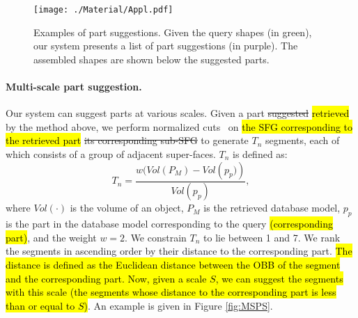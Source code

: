 \begin{figure}[t]\centering
\texttt{[image: ./Material/Appl.pdf]}
\caption{Examples of part suggestions. Given the query shapes (in green), our system presents a list of part suggestions (in purple). The assembled shapes are shown below the suggested parts.}\label{fig:appl}
\end{figure}

\paragraph*{Multi-scale part suggestion.} Our system can suggest parts at various scales. Given a part \st{suggested} \hl{retrieved} by the method above, we perform normalized cuts~\cite{randomizedcutsfunkhousertog2008} on \hl{the SFG corresponding to the retrieved part} \st{its corresponding sub-SFG} to generate $T_n$ segments, each of which consists of a group of adjacent super-faces. $T_n$ is defined as:
\[{T_n} = \frac{{w(Vol(P_M)-Vol\left( {{p_p})} \right)}}{{Vol\left( {{p_p}} \right)}},\] where $Vol\left( \cdot \right)$ is the volume of an object, $P_M$ is the retrieved database model, $p_p$ is the part in the database model corresponding to the query \hl{(corresponding part)}, and the weight $w = 2$. We constrain $T_n$ to lie between 1 and 7. We rank the segments in ascending order by their distance to the corresponding part. \hl{The distance is defined as the Euclidean distance between the OBB of the segment and the corresponding part. Now, given a scale $S$, we can suggest the segments with this scale (the segments whose distance to the corresponding part is less than or equal to $S$)}. An example is given in Figure \ref{fig:MSPS}.


